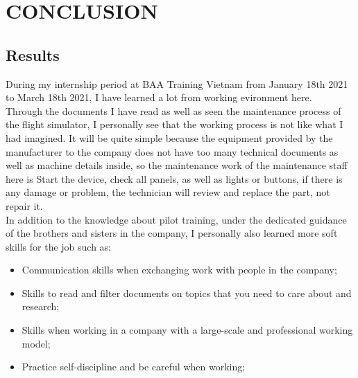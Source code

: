 \chapter{CONCLUSION}

\renewcommand{\headrulewidth}{0.5pt}
\renewcommand{\footrulewidth}{0.5pt}
\thispagestyle{plain}
\pagestyle{fancy}
\fancyhf{}
\raggedright
{}

\justifying

\section{Results}
    During my internship period at BAA Training Vietnam from January 18th 2021 to March 18th 2021, I have learned 
    a lot from working evironment here. \\
    \vspace{3mm}
    Through the documents I have read as well as seen the maintenance process of the flight simulator, I personally 
    see that the working process is not like what I had imagined. It will be quite simple because the equipment 
    provided by the manufacturer to the company does not have too many technical documents as well as machine details 
    inside, so the maintenance work of the maintenance staff here is Start the device, check all panels, as well as 
    lights or buttons, if there is any damage or problem, the technician will review and replace the part, not repair it. \\ 
    \vspace{3mm}
    In addition to the knowledge about pilot training, under the dedicated guidance of the brothers and sisters in the 
    company, I personally also learned more soft skills for the job such as:
    \begin{itemize}
        \item Communication skills when exchanging work with people in the company;
        \item Skills to read and filter documents on topics that you need to care about and research;
        \item Skills when working in a company with a large-scale and professional working model;
        \item Practice self-discipline and be careful when working;
    \end{itemize}

